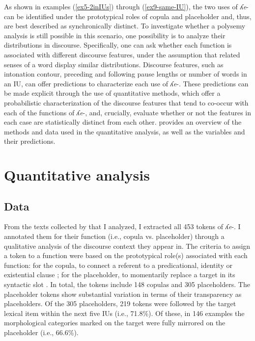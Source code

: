 \documentclass[output=paper,colorlinks,citecolor=brown
\ChapterDOI{10.5281/zenodo.15697581}
]{langscibook}
\begin{document}
As shown in examples (\ref{ex5-2inIUs}) through (\ref{ex9-same-IU}), the two uses of \textit{ʎe}- can be identified under the prototypical roles of copula and placeholder and, thus, are best described as synchronically distinct. 
To investigate whether a polysemy analysis is still possible in this scenario, one possibility is to analyze their distributions in discourse. 
Specifically, one can ask whether each function is associated with different discourse features, under the assumption that related senses of a word display similar distributions. 
Discourse features, such as intonation contour, preceding and following pause lengths or number of words in an IU, can offer predictions to characterize each use of \textit{ʎe}-. 
These predictions can be made explicit through the use of quantitative methods, which offer a probabilistic characterization of the discourse features that tend to co-occur with each of the functions of \textit{ʎe}-, and, crucially, evaluate whether or not the features in each case are statistically distinct from each other.
 provides an overview of the methods and data used in the quantitative analysis, as well as the variables and their predictions.

\section{Quantitative analysis} \label{sec_quant}

\subsection{Data} \label{quant_data}

From the texts collected by \citet{Nikolaeva_Mayer2004} that I analyzed, I extracted all 453 tokens of \textit{ʎe}-.
I annotated them for their function (i.e., copula vs. placeholder) through a qualitative analysis of the discourse context they appear in. 
The criteria to assign a token to a function were based on the prototypical role(s) associated with each function: for the copula, to connect a referent to a predicational, identity or existential clause \citep{Citko2014}; for the placeholder, to momentarily replace a target in its syntactic slot \citep{Hayashi&Yoon2010}. 
In total, the tokens include 148 copulas and 305 placeholders.  
The placeholder tokens show substantial variation in terms of their transparency as placeholders. 
Of the 305 placeholders, 219 tokens were followed by the target lexical item within the next five IUs (i.e., 71.8\%).
Of these, in 146 examples the morphological categories marked on the target were fully mirrored on the placeholder (i.e., 66.6\%). 
\end{document}
